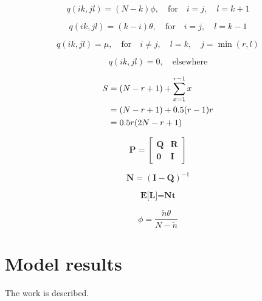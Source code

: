 \documentclass[10pt,a4paper,conference]{IEEEtran}
\begin{document}
\begin{equation}
    q(i k,j l) = (N - k)\phi,\quad\textrm{for}\quad i = j,\quad l = k + 1
\end{equation}

\begin{equation}
    q(i k,j l) = (k - i)\theta,\quad\textrm{for}\quad i = j,\quad l = k - 1
\end{equation}

\begin{equation}
    q(i k,j l) = \mu,\quad\textrm{for}\quad i \neq j,\quad l = k,\quad j = \min(r, l)
\end{equation}

\begin{equation}
    q(i k,j l) = 0,\quad\textrm{elsewhere}
\end{equation}

\begin{align}\label{states_num}
       S & = (N - r + 1) + \sum_{x=1}^{r-1} x\notag \\
         & = (N - r + 1) + 0.5 (r - 1) r\notag \\
         & = 0.5 r (2 N - r + 1)
\end{align}

\begin{equation}
    \textbf{P} = \left[\begin{array}{c|c}
                   \textbf{Q} & \textbf{R} \\
                   \hline
                   \textbf{0} & \textbf{I}
                 \end{array}\right]
\end{equation}

\begin{equation}
    \textbf{N} = (\textbf{I} - \textbf{Q})^{-1}
\end{equation}

\begin{equation}
    \textbf{E[L]} = \textbf{Nt}
\end{equation}

\begin{equation}
    \phi = \frac{\tilde{n}\theta}{N - \tilde{n}}
\end{equation}

\section{Model results}
\label{results}

The work is described.
\end{document}
